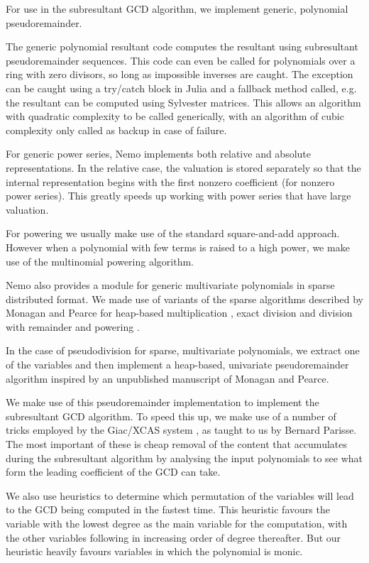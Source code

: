 \documentclass{sig-alternate-05-2015}
\begin{document}
For use in the subresultant GCD algorithm, we implement generic, polynomial
pseudoremainder. 

The generic polynomial resultant code computes the resultant using subresultant
pseudoremainder sequences. This code can even be called for polynomials over a
ring with zero divisors, so long as impossible inverses are caught. The exception
can be caught using a try/catch block in Julia and a fallback method called, e.g.
the resultant can be computed using Sylvester matrices. This allows an algorithm
with quadratic complexity to be called generically, with an algorithm of cubic
complexity only called as backup in case of failure.

For generic power series, Nemo implements both relative and absolute
representations. In the relative case, the valuation is stored separately so that
the internal representation begins with the first nonzero coefficient (for nonzero
power series). This greatly speeds up working with power series that have large
valuation.

For powering we usually make use of the standard square-and-add approach. However
when a polynomial with few terms is raised to a high power, we make use of the
multinomial powering algorithm.

Nemo also provides a module for generic multivariate polynomials in sparse distributed
format. We made use of variants of the sparse algorithms described by Monagan and
Pearce for heap-based multiplication \cite{heapmul}, exact division and division with
remainder \cite{heapdiv} and powering \cite{heappow}.

In the case of pseudodivision for sparse, multivariate polynomials, we extract one
of the variables and then implement a heap-based, univariate pseudoremainder
algorithm inspired by an unpublished manuscript of Monagan and Pearce.

We make use of this pseudoremainder implementation to implement the subresultant
GCD algorithm. To speed this up, we make use of a number of tricks employed by the
Giac/XCAS system \cite{giac}, as taught to us by Bernard Parisse. The most important
of these is cheap removal of the content that accumulates during the subresultant
algorithm by analysing the input polynomials to see what form the leading coefficient
of the GCD can take.

We also use heuristics to determine which permutation of the variables will lead to
the GCD being computed in the fastest time. This heuristic favours the variable with
the lowest degree as the main variable for the computation, with the other variables 
following in increasing order of degree thereafter. But our heuristic heavily favours
variables in which the polynomial is monic.
\end{document}
